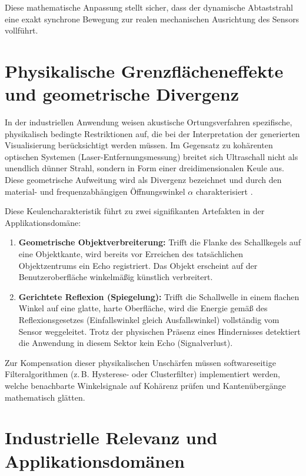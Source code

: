 Diese mathematische Anpassung stellt sicher, dass der dynamische Abtaststrahl eine exakt synchrone Bewegung zur realen mechanischen Ausrichtung des Sensors vollführt.

\section{Physikalische Grenzflächeneffekte und geometrische Divergenz}
\label{sec:Physikalische_Restriktionen}

In der industriellen Anwendung weisen akustische Ortungsverfahren spezifische, physikalisch bedingte Restriktionen auf, die bei der Interpretation der generierten Visualisierung berücksichtigt werden müssen. Im Gegensatz zu kohärenten optischen Systemen (Laser-Entfernungsmessung) breitet sich Ultraschall nicht als unendlich dünner Strahl, sondern in Form einer dreidimensionalen Keule aus. Diese geometrische Aufweitung wird als Divergenz bezeichnet und durch den material- und frequenzabhängigen Öffnungswinkel $\alpha$ charakterisiert \cite{Klemenz:2019}.

Diese Keulencharakteristik führt zu zwei signifikanten Artefakten in der Applikationsdomäne:

\begin{enumerate}
	\item \textbf{Geometrische Objektverbreiterung:} Trifft die Flanke des Schallkegels auf eine Objektkante, wird bereits vor Erreichen des tatsächlichen Objektzentrums ein Echo registriert. Das Objekt erscheint auf der Benutzeroberfläche winkelmä\ss ig künstlich verbreitert.
	\item \textbf{Gerichtete Reflexion (Spiegelung):} Trifft die Schallwelle in einem flachen Winkel auf eine glatte, harte Oberfläche, wird die Energie gemä\ss{} des Reflexionsgesetzes (Einfallswinkel gleich Ausfallswinkel) vollständig vom Sensor weggeleitet. Trotz der physischen Präsenz eines Hindernisses detektiert die Anwendung in diesem Sektor kein Echo (Signalverlust).
\end{enumerate}
	
	Zur Kompensation dieser physikalischen Unschärfen müssen softwareseitige Filteralgorithmen (z.\,B. Hysterese- oder Clusterfilter) implementiert werden, welche benachbarte Winkelsignale auf Kohärenz prüfen und Kantenübergänge mathematisch glätten.
	
	\section{Industrielle Relevanz und Applikationsdomänen}
	\label{sec:Industrielle_Relevanz}
	
